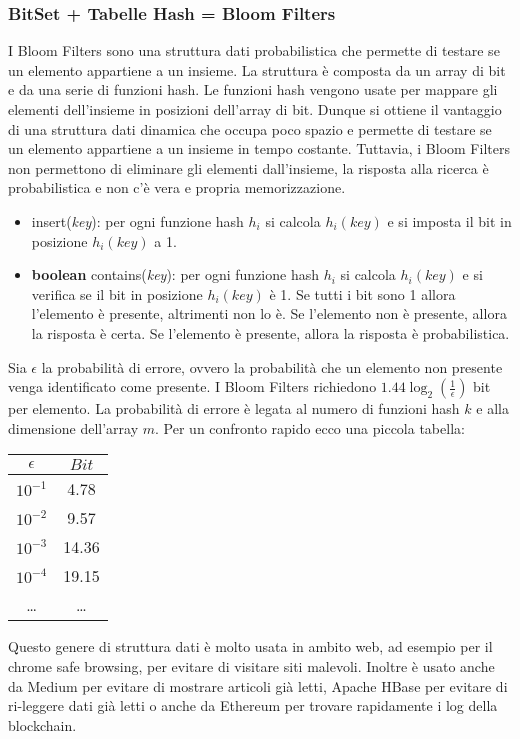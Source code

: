     \subsubsection{BitSet + Tabelle Hash = Bloom Filters}
        I Bloom Filters sono una struttura dati probabilistica che permette di testare se un elemento appartiene a un insieme. La struttura è composta da un array di bit e da una serie di funzioni hash. Le funzioni hash vengono usate per mappare gli elementi dell'insieme in posizioni dell'array di bit. Dunque si ottiene il vantaggio di una struttura dati dinamica che occupa poco spazio e permette di testare se un elemento appartiene a un insieme in tempo costante. Tuttavia, i Bloom Filters non permettono di eliminare gli elementi dall'insieme, la risposta alla ricerca è probabilistica e non c'è vera e propria memorizzazione.
        \begin{itemize}
            \item insert(\textit{key}): per ogni funzione hash $h_i$ si calcola $h_i(key)$ e si imposta il bit in posizione $h_i(key)$ a 1.
            \item \textbf{boolean} contains(\textit{key}): per ogni funzione hash $h_i$ si calcola $h_i(key)$ e si verifica se il bit in posizione $h_i(key)$ è 1. Se tutti i bit sono 1 allora l'elemento è presente, altrimenti non lo è. 
            \subitem Se l'elemento non è presente, allora la risposta è certa. 
            \subitem Se l'elemento è presente, allora la risposta è probabilistica.
        \end{itemize}
        Sia $\epsilon$ la probabilità di errore, ovvero la probabilità che un elemento non presente venga identificato come presente. I Bloom Filters richiedono $1.44\log_2\left(\frac{1}{\epsilon}\right)$ bit per elemento. La probabilità di errore è legata al numero di funzioni hash $k$ e alla dimensione dell'array $m$. Per un confronto rapido ecco una piccola tabella:
        \begin{table}[H]
            \centering
            \begin{tabular}{|c|c|}
                \hline
                $\epsilon$ & $Bit$\\
                \hline
                $10^{-1}$ & 4.78\\
                $10^{-2}$ & 9.57\\
                $10^{-3}$ & 14.36\\
                $10^{-4}$ & 19.15\\
                \dots & \dots\\
                \hline
            \end{tabular}
        \end{table}
        Questo genere di struttura dati è molto usata in ambito web, ad esempio per il chrome safe browsing, per evitare di visitare siti malevoli. Inoltre è usato anche da Medium per evitare di mostrare articoli già letti, Apache HBase per evitare di ri-leggere dati già letti o anche da Ethereum per trovare rapidamente i log della blockchain.
